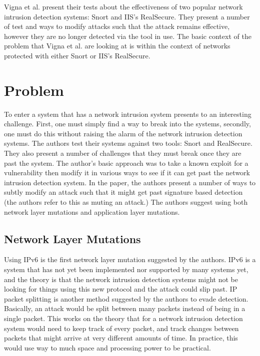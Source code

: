 \documentclass{reading_glasses}
\begin{document}
Vigna et al. present their tests about the effectiveness of two popular network intrusion detection systems: Snort and IIS's RealSecure.  They present a number of test and ways to modify attacks such that the attack remains effective, however they are no longer detected via the tool in use.  
The basic context of the problem that Vigna et al. are looking at is within the context of networks protected with either Snort or IIS's RealSecure. \cite{vigna2004testing}

\section{Problem}
To enter a system that has a network intrusion system presents to an interesting challenge.  First, one must simply find a way to break into the systems, secondly, one must do this without raising the alarm of the network intrusion detection systems.  The authors test their systems against two tools: Snort and RealSecure.  They also present a number of challenges that they must break once they are past the system.  The author's basic approach was to take a known exploit for a vulnerability then modify it in various ways to see if it can get past the network intrusion detection system.  In the paper, the authors present a number of ways to subtly modify an attack such that it might get past signature based detection (the authors refer to this as muting an attack.)  The authors suggest using both network layer mutations and application layer mutations. \cite{vigna2004testing}

\subsection{Network Layer Mutations}
Using IPv6 is the first network layer mutation suggested by the authors.  IPv6 is a system that has not yet been implemented nor supported by many systems yet, and the theory is that the network intrusion detection systems might not be looking for things using this new protocol and the attack could slip past.  IP packet splitting is another method suggested by the authors to evade detection.  Basically, an attack would be split between many packets instead of being in a single packet.  This works on the theory that for a network intrusion detection system would need to keep track of every packet, and track changes between packets that might arrive at very different amounts of time.  In practice, this would use way to much space and processing power to be practical. \cite{vigna2004testing}
\end{document}
